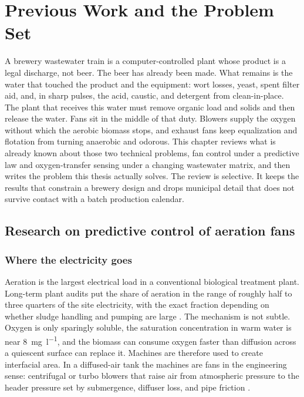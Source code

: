 \chapter{Previous Work and the Problem Set}
\label{ch:previous}

A brewery wastewater train is a computer-controlled plant whose product is a legal discharge, not beer. The beer has already been made. What remains is the water that touched the product and the equipment: wort losses, yeast, spent filter aid, and, in sharp pulses, the acid, caustic, and detergent from clean-in-place. The plant that receives this water must remove organic load and solids and then release the water. Fans sit in the middle of that duty. Blowers supply the oxygen without which the aerobic biomass stops, and exhaust fans keep equalization and flotation from turning anaerobic and odorous. This chapter reviews what is already known about those two technical problems, fan control under a predictive law and oxygen-transfer sensing under a changing wastewater matrix, and then writes the problem this thesis actually solves. The review is selective. It keeps the results that constrain a brewery design and drops municipal detail that does not survive contact with a batch production calendar.

\section{Research on predictive control of aeration fans}
\label{sec:prev-mpc}

\subsection{Where the electricity goes}

Aeration is the largest electrical load in a conventional biological treatment plant. Long-term plant audits put the share of aeration in the range of roughly half to three quarters of the site electricity, with the exact fraction depending on whether sludge handling and pumping are large \cite{longo2016,epa2010energy,amand2013review}. The mechanism is not subtle. Oxygen is only sparingly soluble, the saturation concentration in warm water is near \SI{8}{\milli\gram\per\litre}, and the biomass can consume oxygen faster than diffusion across a quiescent surface can replace it. Machines are therefore used to create interfacial area. In a diffused-air tank the machines are fans in the engineering sense: centrifugal or turbo blowers that raise air from atmospheric pressure to the header pressure set by submergence, diffuser loss, and pipe friction \cite{mueller2002aeration,rosso2008state,tchobanoglous2014}.

